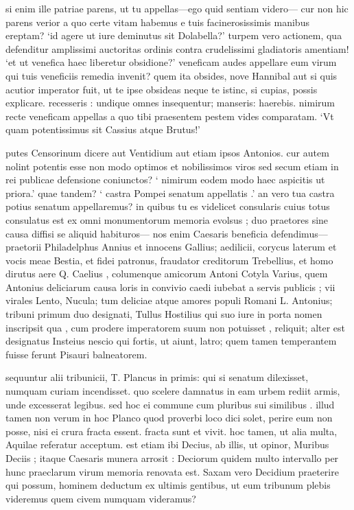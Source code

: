  si enim ille patriae parens, ut tu appellas—ego quid sentiam videro— cur non hic parens verior a quo certe vitam habemus e tuis facinerosissimis manibus ereptam? `id agere ut iure deminutus sit Dolabella?' turpem vero actionem, qua defenditur amplissimi auctoritas ordinis contra crudelissimi gladiatoris amentiam! `et ut venefica haec liberetur obsidione?' veneficam audes appellare eum virum qui tuis veneficiis remedia invenit? quem ita obsides, nove Hannibal aut si quis acutior imperator fuit, ut te ipse obsideas neque te istinc, si cupias, possis explicare. recesseris : undique omnes insequentur; manseris: haerebis. nimirum recte veneficam appellas a quo tibi praesentem pestem vides comparatam. `Vt quam potentissimus sit Cassius atque Brutus!'

 putes Censorinum dicere aut Ventidium aut etiam ipsos Antonios. cur autem nolint potentis esse non modo optimos et nobilissimos viros sed secum etiam in rei publicae defensione coniunctos? ` nimirum eodem modo haec aspicitis ut priora.' quae tandem? ` castra Pompei senatum appellatis .' an vero tua castra potius senatum appellaremus? in quibus tu es videlicet consularis cuius totus consulatus est ex omni monumentorum memoria evolsus ; duo praetores sine causa diffisi se aliquid habituros— nos enim Caesaris beneficia defendimus—praetorii Philadelphus Annius et innocens Gallius; aedilicii, corycus laterum et vocis meae Bestia, et fidei patronus, fraudator creditorum Trebellius, et homo dirutus aere Q. Caelius , columenque amicorum Antoni Cotyla Varius, quem Antonius deliciarum causa loris in convivio caedi iubebat a servis publicis ; vii virales Lento, Nucula; tum deliciae atque amores populi Romani L. Antonius; tribuni primum duo designati, Tullus Hostilius qui suo iure in porta nomen inscripsit qua , cum prodere imperatorem suum non potuisset , reliquit; alter est designatus Insteius nescio qui fortis, ut aiunt, latro; quem tamen temperantem fuisse ferunt Pisauri balneatorem.

 sequuntur alii tribunicii, T. Plancus in primis: qui si senatum dilexisset, numquam curiam incendisset. quo scelere damnatus in eam urbem rediit armis, unde excesserat legibus. sed hoc ei commune cum pluribus sui similibus . illud tamen non verum in hoc Planco quod proverbi loco dici solet, perire eum non posse, nisi ei crura fracta essent. fracta sunt et vivit. hoc tamen, ut alia multa, Aquilae referatur acceptum. est etiam ibi Decius, ab illis, ut opinor, Muribus Deciis ; itaque Caesaris munera arrosit : Deciorum quidem multo intervallo per hunc praeclarum virum memoria renovata est. Saxam vero Decidium praeterire qui possum, hominem deductum ex ultimis gentibus, ut eum tribunum plebis videremus quem civem numquam videramus?

